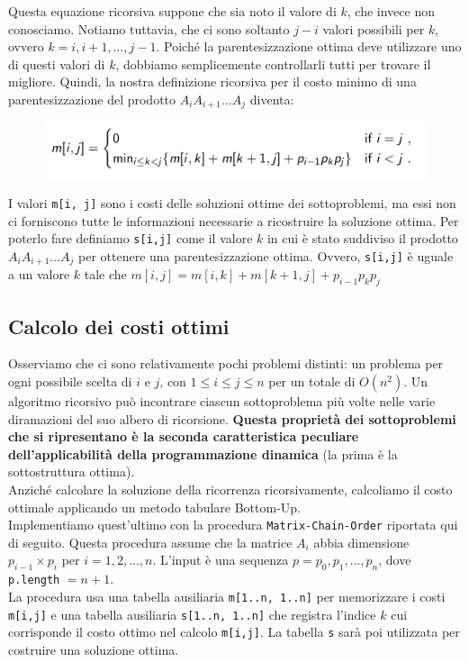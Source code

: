 Questa equazione ricorsiva suppone che sia noto il valore di $k$, che
invece non conosciamo. Notiamo tuttavia, che ci sono soltanto $j-i$
valori possibili per $k$, ovvero $k=i, i+1, \ldots, j-1$. Poiché la
parentesizzazione ottima deve utilizzare uno di questi valori di $k$,
dobbiamo semplicemente controllarli tutti per trovare il migliore.
Quindi, la nostra definizione ricorsiva per il costo minimo di una
parentesizzazione del prodotto $A_i A_{i+1} \ldots A_j$ diventa:

\begin{figure}[H]
  \centering
  \includegraphics[width=15cm, keepaspectratio]{capitoli/programmazione_dinamica/imgs/matrix2.png}
\end{figure}

I valori \texttt{m[i,\ j]} sono i costi delle soluzioni ottime dei
sottoproblemi, ma essi non ci forniscono tutte le informazioni
necessarie a ricostruire la soluzione ottima. Per poterlo fare definiamo
\texttt{s[i,j]} come il valore $k$ in cui è stato suddiviso il
prodotto $A_{i} A_{i+1} \ldots A_j$ per ottenere una parentesizzazione
ottima. Ovvero, \texttt{s[i,j]} è uguale a un valore $k$ tale che
$m[i,j] = m[i,k] + m[k+1,j] + p_{i-1} p_k p_j$

\subsection{Calcolo dei costi ottimi}

Osserviamo che ci sono relativamente pochi problemi distinti: un
problema per ogni possibile scelta di $i$ e $j$, con
$1 \le i \le j \le n$ per un totale di $O(n^2)$. Un algoritmo
ricorsivo può incontrare ciascun sottoproblema più volte nelle varie
diramazioni del suo albero di ricorsione. \textbf{Questa proprietà dei
  sottoproblemi che si ripresentano è la seconda caratteristica peculiare
  dell'applicabilità della programmazione dinamica} (la prima è la
sottostruttura ottima).\\

Anziché calcolare la soluzione della ricorrenza ricorsivamente,
calcoliamo il costo ottimale applicando un metodo tabulare Bottom-Up.\\
Implementiamo quest'ultimo con la procedura \texttt{Matrix-Chain-Order}
riportata qui di seguito. Questa procedura assume che la matrice $A_i$
abbia dimensione $p_{i-1} \times p_i$ per $i=1,2,\ldots,n$. L'input è una
sequenza $p = p_0, p_1, \ldots, p_n$, dove \texttt{p.length} $= n+1$.\\
La procedura usa una tabella ausiliaria \texttt{m[1..n,\ 1..n]} per
memorizzare i costi \texttt{m[i,j]} e una tabella ausiliaria
\texttt{s[1..n,\ 1..n]} che registra l'indice $k$ cui corrisponde
il costo ottimo nel calcolo \texttt{m[i,j]}. La tabella \texttt{s}
sarà poi utilizzata per costruire una soluzione ottima.\\

